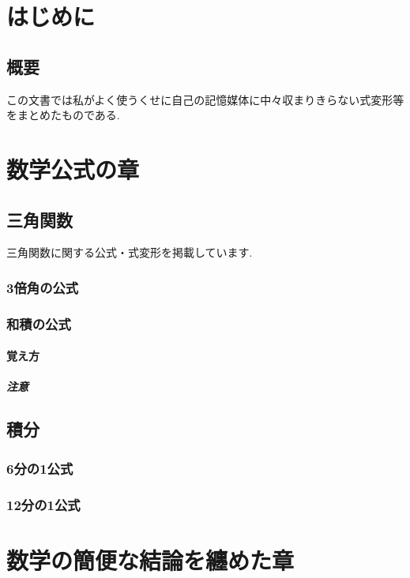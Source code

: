 \documentclass[]{jreport}
\begin{document}
\part{はじめに}
\chapter{概要}

この文書では私がよく使うくせに自己の記憶媒体に中々収まりきらない式変形等をまとめたものである.

\part{数学公式の章}
\chapter{三角関数}

三角関数に関する公式・式変形を掲載しています.

\section{3倍角の公式}
\section{和積の公式}

\subsection{覚え方}

\subsubsection{注意}

\chapter{積分}

\section{6分の1公式}
\section{12分の1公式}

\part{数学の簡便な結論を纏めた章}
\end{document}
